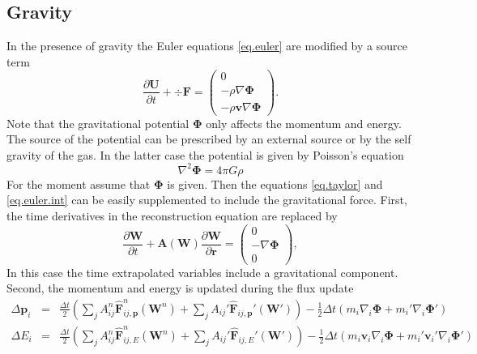 \subsection{Gravity}
In the presence of gravity the Euler equations \ref{eq.euler} are modified by
a source term
%
\begin{equation}
    \frac{\partial \mathbf{U}}{\partial t} + \div \mathbf{F} =\left( 
    \begin{array}{c}
    	0 \\
        -\rho\nabla\mathbf{\Phi} \\
        -\rho\mathbf{v}\nabla\mathbf{\Phi}
    \end{array}\right).
\end{equation}
%
Note that the gravitational potential $\mathbf{\Phi}$ only affects the
momentum and energy. The source of the potential can be prescribed by
an external source or by the self gravity of the gas. In the latter case
the potential is given by Poisson's equation
%
\begin{equation}
	\nabla^2\mathbf{\Phi} = 4\pi G\rho
\end{equation}
For the moment assume that $\mathbf{\Phi}$ is given. Then the equations
\ref{eq.taylor} and \ref{eq.euler.int} can be easily supplemented to
include the gravitational force. First, the time derivatives in the
reconstruction equation are replaced by
%
\begin{equation}
    \frac{\partial\mathbf{W}}{\partial t}  + \mathbf{A}
    	\left(\mathbf{W}\right)\frac{\partial\mathbf{W}}{\partial\mathbf{r}}
        = \left(
        	\begin{array}{c}
            0 \\
            -\nabla\mathbf{\Phi} \\
            0
            \end{array}
         \right),
\end{equation}
%
In this case the time extrapolated variables include a gravitational
component. Second, the momentum and energy is updated during the flux update
%
\begin{equation}
	\begin{array}{rcl}
        \Delta\mathbf{p}_i & = &
        	\frac{\Delta t}{2}\left(\sum_j A_{ij}^n\mathbf{\hat{F}}_{ij,\mathbf{p}}^n
            (\mathbf{W}^n) + \sum_j A_{ij}'\mathbf{\hat{F}}_{ij,\mathbf{p}}'
            (\mathbf{W}')\right) - \frac{1}{2}\Delta t\left( 
        	m_i\nabla_i\mathbf{\Phi} + m_i'\nabla_i\mathbf{\Phi}'\right)\\
        \Delta E_i & = &
        	\frac{\Delta t}{2}\left(\sum_j A_{ij}^n\mathbf{\hat{F}}_{ij,E}^n
            (\mathbf{W}^n) + \sum_j A_{ij}'\mathbf{\hat{F}}_{ij,E}'
            (\mathbf{W}')\right) - \frac{1}{2}\Delta t\left( 
        	m_i\mathbf{v}_i\nabla_i\mathbf{\Phi} +
            m_i'\mathbf{v}_i'\nabla_i\mathbf{\Phi}'\right)\\
    \end{array}
\end{equation}
%
